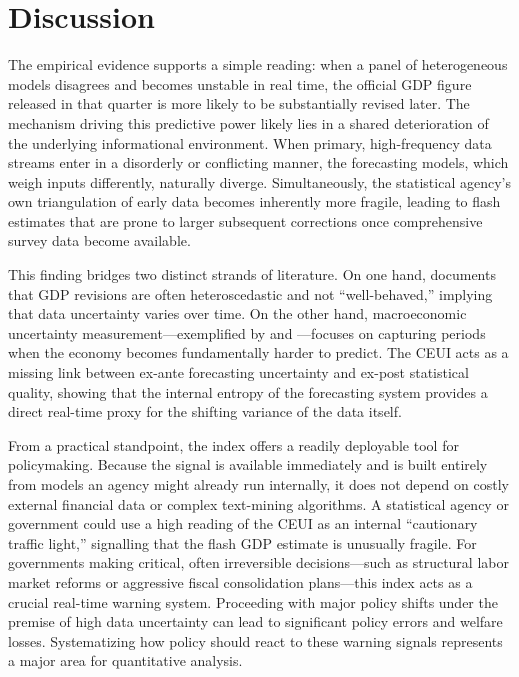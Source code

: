 \documentclass[12pt,a4paper]{article}
\theoremstyle{remark}
\begin{document}
\section{Discussion}
\label{sec:discussion}

The empirical evidence supports a simple reading: when a panel of heterogeneous models disagrees and becomes unstable in real time, the official GDP figure released in that quarter is more likely to be substantially revised later. The mechanism driving this predictive power likely lies in a shared deterioration of the underlying informational environment. When primary, high-frequency data streams enter in a disorderly or conflicting manner, the forecasting models, which weigh inputs differently, naturally diverge. Simultaneously, the statistical agency's own triangulation of early data becomes inherently more fragile, leading to flash estimates that are prone to larger subsequent corrections once comprehensive survey data become available.

This finding bridges two distinct strands of literature. On one hand, \citet{aruoba2008} documents that GDP revisions are often heteroscedastic and not ``well-behaved,'' implying that data uncertainty varies over time. On the other hand, macroeconomic uncertainty measurement---exemplified by \citet{jurado2015} and \citet{baker2016measuring}---focuses on capturing periods when the economy becomes fundamentally harder to predict. The CEUI acts as a missing link between ex-ante forecasting uncertainty and ex-post statistical quality, showing that the internal entropy of the forecasting system provides a direct real-time proxy for the shifting variance of the data itself.

From a practical standpoint, the index offers a readily deployable tool for policymaking. Because the signal is available immediately and is built entirely from models an agency might already run internally, it does not depend on costly external financial data or complex text-mining algorithms. A statistical agency or government could use a high reading of the CEUI as an internal ``cautionary traffic light,'' signalling that the flash GDP estimate is unusually fragile. For governments making critical, often irreversible decisions—such as structural labor market reforms or aggressive fiscal consolidation plans—this index acts as a crucial real-time warning system. Proceeding with major policy shifts under the premise of high data uncertainty can lead to significant policy errors and welfare losses. Systematizing how policy should react to these warning signals represents a major area for quantitative analysis.
\end{document}
